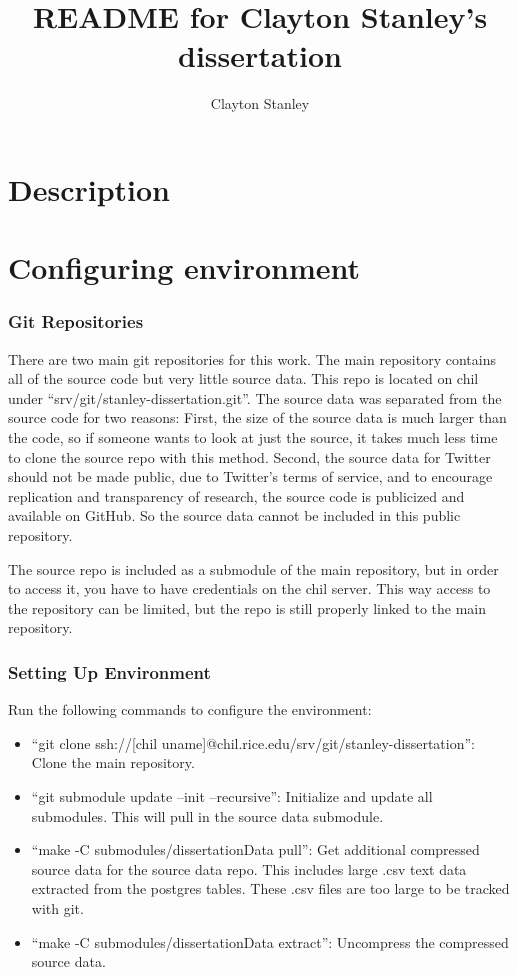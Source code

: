 \documentclass[man,floatsintext,donotrepeattitle]{apa6}
\title{README for Clayton Stanley's dissertation}
\author{Clayton Stanley}
\affiliation{Rice University}
\begin{document}
\maketitle

\section{Description}



\section{Configuring environment}

\subsubsection{Git Repositories}

There are two main git repositories for this work.
The main repository contains all of the source code but very little source data.
This repo is located on chil under ``srv/git/stanley-dissertation.git''.
The source data was separated from the source code for two reasons:
First, the size of the source data is much larger than the code, so if someone wants to look at just the source, it takes much less time to clone the source repo with this method.
Second, the source data for Twitter should not be made public, due to Twitter's terms of service,
and to encourage replication and transparency of research, the source code is publicized and available on GitHub.
So the source data cannot be included in this public repository.

The source repo is included as a submodule of the main repository, but in order to access it, you have to have credentials on the chil server.
This way access to the repository can be limited, but the repo is still properly linked to the main repository.

\subsubsection{Setting Up Environment}

Run the following commands to configure the environment:

\begin{itemize}
  \item ``git clone ssh://[chil uname]@chil.rice.edu/srv/git/stanley-dissertation'':
    Clone the main repository.
  \item ``git submodule update --init --recursive'':
    Initialize and update all submodules.
    This will pull in the source data submodule.
  \item ``make -C submodules/dissertationData pull'':
    Get additional compressed source data for the source data repo.
    This includes large .csv text data extracted from the postgres tables.
    These .csv files are too large to be tracked with git.
  \item ``make -C submodules/dissertationData extract'':
    Uncompress the compressed source data.
\end{itemize}
\end{document}
